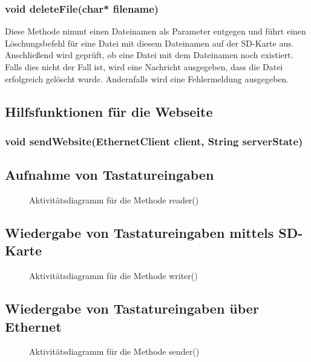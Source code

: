 \subsubsection{void deleteFile(char* filename)}
Diese Methode nimmt einen Dateinamen als Parameter entgegen und führt einen Löschungsbefehl für eine Datei mit diesem Dateinamen auf der SD-Karte aus. Anschließend wird geprüft, ob eine Datei mit dem Dateinamen noch existiert. Falls dies nicht der Fall ist, wird eine Nachricht ausgegeben, dass die Datei erfolgreich gelöscht wurde. Andernfalls wird eine Fehlermeldung ausgegeben.


\subsection{Hilfsfunktionen für die Webseite}
\subsubsection{void sendWebsite(EthernetClient client, String serverState)}


\subsection{Aufnahme von Tastatureingaben}
\begin{figure}
  \centering
  \caption{Aktivitätsdiagramm für die Methode reader()}
  \label{diagram_reader}
\end{figure}


\subsection{Wiedergabe von Tastatureingaben mittels SD-Karte}
\begin{figure}
  \centering
  \caption{Aktivitätsdiagramm für die Methode writer()}
  \label{diagram_writer}
\end{figure}


\subsection{Wiedergabe von Tastatureingaben über Ethernet}
\begin{figure}
  \centering
  \caption{Aktivitätsdiagramm für die Methode sender()}
  \label{diagram_sender}
\end{figure}


